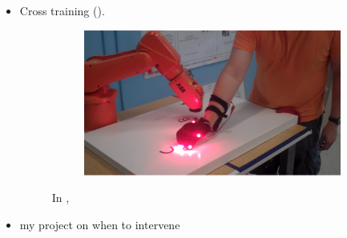 \begin{itemize}
\begin{figure}[ht]
            \label{fig:bam}
        \end{figure}
    \item Cross training  (\cite{nikolaidis2013human}).
        \begin{figure}[ht]
            \centering
            \begin{subfigure}[b]{.5\linewidth}
            \includegraphics[width=\linewidth]{./cross_train.png}
            \caption{}
            \end{subfigure}
            \caption{In , }
            \label{fig:cross_train}
        \end{figure}
    \item my project on when to intervene
\end{itemize}

